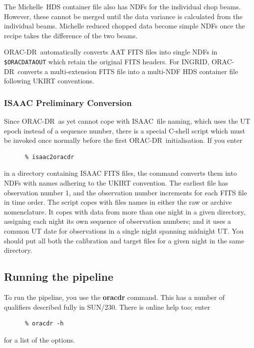 \documentclass[twoside,11pt]{article}
\newcommand{\htmladdnormallink}[2]{#1}
\newcommand{\xref}[3]{#1}
\newcommand{\xlabel}[1]{}
\renewcommand{\_}{\texttt{\symbol{95}}}
\newcommand{\ORACDR}{{\footnotesize ORAC-DR}}
\newcommand{\ISAAC}{\htmladdnormallink{ISAAC}{http://www.eso.org/instruments/isaac/}}
\newcommand{\Michelle}{\htmladdnormallink{Michelle}{http://www.jach.hawaii.edu/JACpublic/UKIRT/instruments/michelle/michelle.html}}
\begin{document}
The \Michelle\ HDS container file also has NDFs for the individual chop
beams.  However, these cannot be merged until the data variance is
calculated from the individual beams.  Michelle reduced chopped data
become simple NDFs once the recipe takes the difference of the two
beams.

\ORACDR\ automatically converts AAT FITS files into single NDFs in
{\tt \$ORAC\_DATA\_OUT} which retain the original FITS headers.
For INGRID, \ORACDR\ converts a multi-extension FITS file into a
multi-NDF HDS container file following UKIRT conventions.

\subsubsection{\xlabel{isaac_preliminary_conversion}ISAAC Preliminary
Conversion\label{isaac_preliminary_conversion}}

Since \ORACDR\ as yet cannot cope with \ISAAC\ file naming, which uses
the UT epoch instead of a sequence number, there is a special C-shell
script which must be invoked once normally before the first \ORACDR\
initialisation.  If you enter

\begin{verbatim}
      % isaac2oracdr
\end{verbatim}
in a directory containing ISAAC FITS files, the command converts them
into NDFs with names adhering to the UKIRT convention.  The earliest
file has observation number 1, and the observation number increments
for each FITS file in time order.  The script copes with files names
in either the raw or archive nomenclature.  It copes with data from
more than one night in a given directory, assigning each night its own
sequence of observation numbers; and it uses a common UT date for
observations in a single night spanning midnight UT. You should put
all both the calibration and target files for a given night in the
same directory.

\subsection{\xlabel{running_the_pipeline}Running the
pipeline\label{running_the_pipeline}}

To run the pipeline, you use the {\bf oracdr} command.  This has a
number of qualifiers described fully in \xref{SUN/230}{sun230}{oracdr}.
There is online help too; enter

\begin{verbatim}
      % oracdr -h
\end{verbatim}
for a list of the options.
\end{document}
